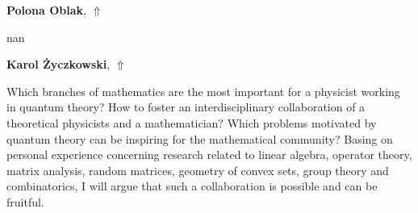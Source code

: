 \documentclass[ILAS2025-program.tex]{subfiles}
\begin{document}
     \hypertarget{down0002}{}\begin{ilasabstract}
    
    \textbf{Polona Oblak},  \hfill \hyperlink{up0002}{$\Uparrow$}
    
    \mtskip
    nan\end{ilasabstract}
     \hypertarget{down0000}{}\begin{ilasabstract}
    
    \textbf{Karol Życzkowski},  \hfill \hyperlink{up0000}{$\Uparrow$}
    
    \mtskip
    Which branches of mathematics are the most important for a physicist working in quantum theory? 
How to foster an interdisciplinary collaboration of a theoretical physicists and a mathematician?
Which problems motivated by quantum theory can be inspiring for the mathematical community?  
Basing on personal experience concerning research related to linear algebra, operator theory, matrix analysis, random matrices, geometry of convex sets, group theory and combinatorics, I will argue that such a collaboration is possible and can be fruitful.
\end{ilasabstract}
    \newpage
\end{document}
